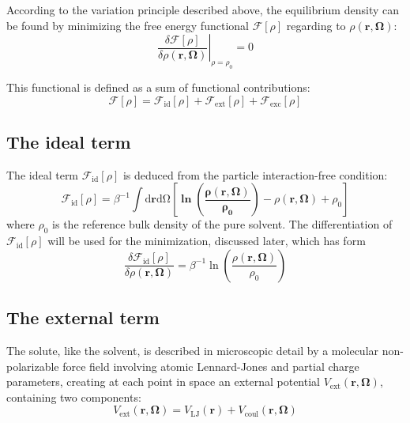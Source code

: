 According to the variation principle described above, the equilibrium
density can be found by minimizing the free energy functional $\mathcal{F}[\rho]$
regarding to $\rho(\mathbf{r},\mathbf{\Omega})$:
\begin{equation}
\left.\frac{\delta\mathcal{F}[\rho]}{\delta\rho(\mathbf{r},\mathbf{\Omega})}\right|_{\rho=\rho_{0}}=0
\end{equation}

This functional is defined as a sum of functional contributions:
\begin{equation}
\mathcal{F}[\rho]=\mathcal{F}_{\mathrm{id}}[\rho]+\mathcal{F}_{\mathrm{ext}}[\rho]+\mathcal{F}_{\mathrm{exc}}[\rho]\label{eq:fff}
\end{equation}


\subsection{The ideal term}

The ideal term $\mathcal{F}_{\mathrm{id}}[\rho]$ is deduced from
the particle interaction-free condition: 
\begin{equation}
\mathcal{F}_{\mathrm{id}}[\rho]=\beta^{-1}\int\mathrm{d}\mathbf{r}\mathrm{d\Omega}\left[\mathbf{\mathbf{\ln\left(\frac{\rho(\mathbf{r},\mathbf{\mathbf{\mathbf{\mathbf{\Omega}}}})}{\rho_{0}}\right)}}-\rho(\mathbf{r},\mathbf{\mathbf{\mathbf{\Omega}}})+\rho_{0}\right]
\end{equation}
where $\rho_{0}$ is the reference bulk density of the pure solvent.
The differentiation of $\mathcal{F}_{\mathrm{id}}[\rho]$ will be
used for the minimization, discussed later, which has form
\begin{equation}
\frac{\delta\mathcal{F}_{\mathrm{id}}[\rho]}{\delta\rho(\mathbf{r},\mathbf{\Omega})}=\beta^{-1}\ln\left(\dfrac{\rho(\mathbf{r},\mathbf{\Omega})}{\rho_{0}}\right)
\end{equation}


\subsection{The external term}

The solute, like the solvent, is described in microscopic detail by
a molecular non-polarizable force field involving atomic Lennard-Jones
and partial charge parameters, creating at each point in space an
external potential $V_{\mathrm{ext}}(\mathbf{r},\mathbf{\mathbf{\mathbf{\mathbf{\Omega}}}})$,
containing two components:
\begin{equation}
V_{\mathrm{ext}}(\mathbf{r},\mathbf{\Omega})=V_{\mathrm{LJ}}(\mathbf{r})+V_{\mathrm{coul}}(\mathbf{r},\mathbf{\Omega})
\end{equation}

